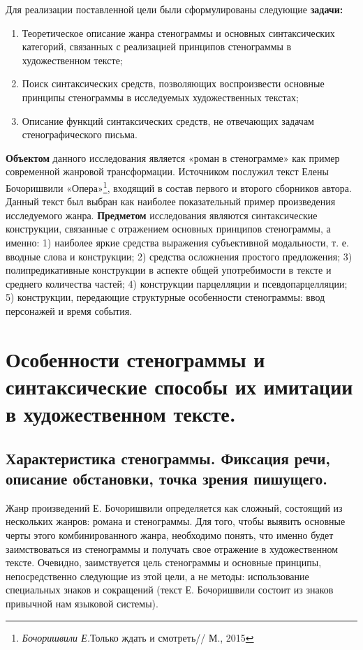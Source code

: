 \documentclass{kursa4}
\begin{document}
    {Для реализации поставленной цели были сформулированы следующие \textbf{задачи:}
    
    \begin{enumerate}
      \item Теоретическое описание жанра стенограммы и основных синтаксических категорий, связанных с реализацией принципов стенограммы в художественном тексте; \item Поиск синтаксических средств, позволяющих воспроизвести основные принципы стенограммы в исследуемых художественных текстах; \item Описание функций синтаксических средств, не отвечающих задачам стенографического письма. \end{enumerate}

    \textbf{Объектом} данного исследования является «роман в стенограмме» как пример современной жанровой трансформации. Источником послужил текст Елены Бочоришвили «Опера»\footnote{\textit{Бочоришвили Е.}{Только ждать и смотреть// М., 2015}}, входящий в состав первого и второго сборников автора. Данный текст был выбран как наиболее показательный пример произведения исследуемого жанра. 
    \textbf{Предметом} исследования являются синтаксические конструкции, связанные с отражением основных принципов стенограммы, а именно: 1) наиболее яркие средства выражения субъективной модальности, т. е. вводные слова и конструкции; 2) средства осложнения простого предложения; 3)  полипредикативные конструкции в аспекте общей употребимости в тексте и среднего количества частей; 4) конструкции парцелляции и псевдопарцелляции; 5) конструкции, передающие структурные особенности стенограммы: ввод персонажей и время события. 

  \setcounter{chapter}{0}
  \chapter {Особенности стенограммы и синтаксические способы их имитации в художественном тексте.}

    \section {Характеристика стенограммы. Фиксация речи, описание обстановки, точка зрения пишущего.}

      Жанр произведений Е. Бочоришвили определяется как сложный, состоящий из нескольких жанров: романа и стенограммы. Для того, чтобы выявить основные черты этого комбинированного жанра, необходимо понять, что именно будет заимствоваться из стенограммы и получать свое отражение в художественном тексте. Очевидно, заимствуется цель стенограммы и основные принципы, непосредственно следующие из этой цели, а не методы: использование специальных знаков и сокращений (текст Е. Бочоришвили состоит из знаков привычной нам языковой системы). 

}
\end{document}
